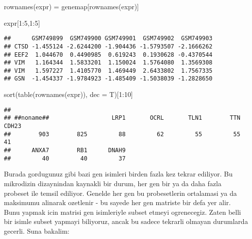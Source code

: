 \documentclass[
]{book}
\newenvironment{Shaded}{\begin{snugshade}}{\end{snugshade}}
\newcommand{\AttributeTok}[1]{\textcolor[rgb]{0.77,0.63,0.00}{#1}}
\newcommand{\DecValTok}[1]{\textcolor[rgb]{0.00,0.00,0.81}{#1}}
\newcommand{\FunctionTok}[1]{\textcolor[rgb]{0.00,0.00,0.00}{#1}}
\newcommand{\NormalTok}[1]{#1}
\newcommand{\OtherTok}[1]{\textcolor[rgb]{0.56,0.35,0.01}{#1}}
\newcommand{\SpecialCharTok}[1]{\textcolor[rgb]{0.00,0.00,0.00}{#1}}
\begin{document}
\begin{Shaded}
\begin{Highlighting}[]
\FunctionTok{rownames}\NormalTok{(expr) }\OtherTok{=}\NormalTok{ genemap[}\FunctionTok{rownames}\NormalTok{(expr)]}
\end{Highlighting}
\end{Shaded}

\begin{Shaded}
\begin{Highlighting}[]
\NormalTok{expr[}\DecValTok{1}\SpecialCharTok{:}\DecValTok{5}\NormalTok{,}\DecValTok{1}\SpecialCharTok{:}\DecValTok{5}\NormalTok{]}
\end{Highlighting}
\end{Shaded}

\begin{verbatim}
##      GSM749899  GSM749900 GSM749901  GSM749902  GSM749903
## CTSD -1.455124 -2.6244200 -1.904436 -1.5793507 -2.1666262
## EEF2  1.044670  0.4490985  0.619243  0.1930628 -0.4370544
## VIM   1.164344  1.5833201  1.150024  1.5764080  1.3569308
## VIM   1.597227  1.4105770  1.469449  2.6433802  1.7567335
## GSN  -1.454337 -1.9784923 -1.485409 -1.5038039 -1.2828650
\end{verbatim}

\begin{Shaded}
\begin{Highlighting}[]
\FunctionTok{sort}\NormalTok{(}\FunctionTok{table}\NormalTok{(}\FunctionTok{rownames}\NormalTok{(expr)), }\AttributeTok{dec =}\NormalTok{ T)[}\DecValTok{1}\SpecialCharTok{:}\DecValTok{10}\NormalTok{]}
\end{Highlighting}
\end{Shaded}

\begin{verbatim}
## 
## ##noname##                  LRP1       OCRL       TLN1        TTN      CDH23 
##        903        825         88         62         55         55         41 
##      ANXA7        RB1      DNAH9 
##         40         40         37
\end{verbatim}

Burada gordugunuz gibi bazi gen isimleri birden fazla kez tekrar ediliyor. Bu mikrodizin dizaynindan kaynakli bir durum, her gen bir ya da daha fazla probeset ile temsil ediliyor. Genelde her gen bu probesetlerin ortalamasi ya da maksimumu alinarak ozetlenir - bu sayede her gen matriste bir defa yer alir. Bunu yapmak icin matrisi gen isimleriyle subset etmeyi ogrenecegiz. Zaten belli bir isimle subset yapmayi biliyoruz, ancak bu sadece tekrarli olmayan durumlarda gecerli. Suna bakalim:
\end{document}
